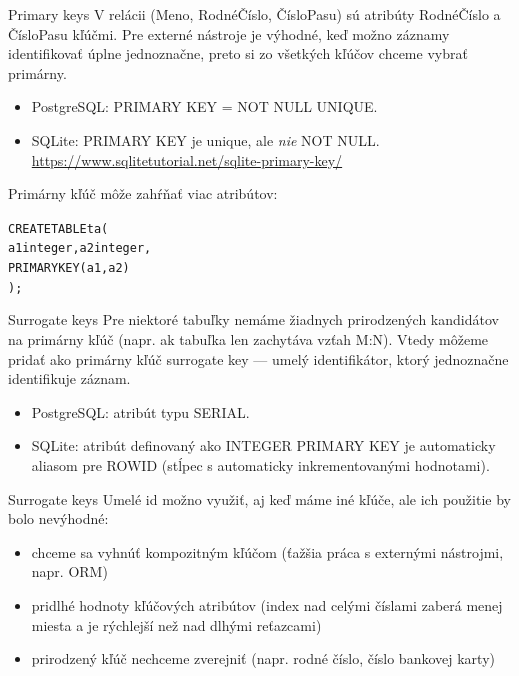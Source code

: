 \documentclass[12pt]{beamer}
\begin{document}
\begin{frame}[fragile]{Primary keys}
V relácii (Meno, RodnéČíslo, ČísloPasu) sú atribúty RodnéČíslo a ČísloPasu kľúčmi.
Pre externé nástroje je výhodné, keď možno záznamy identifikovať úplne jednoznačne,
preto si zo všetkých kľúčov chceme vybrať primárny.
\begin{itemize}
\item PostgreSQL: \alert{PRIMARY KEY} = NOT NULL UNIQUE.
\item SQLite: PRIMARY KEY je unique, ale \emph{nie} NOT NULL.\\
      {\scriptsize \url{https://www.sqlitetutorial.net/sqlite-primary-key/}}
\end{itemize}

\bigskip
Primárny kľúč môže zahŕňať viac atribútov:
\begin{alltt}
CREATE TABLE ta (
  a1 integer, a2 integer,
  \alert{PRIMARY KEY (a1, a2)}
);
\end{alltt}
\end{frame}

\begin{frame}[fragile]{Surrogate keys}
Pre niektoré tabuľky nemáme žiadnych prirodzených kandidátov na primárny kľúč
(napr. ak tabuľka len zachytáva vzťah M:N). Vtedy môžeme pridať ako primárny kľúč
\alert{surrogate key} --- umelý identifikátor, ktorý jednoznačne identifikuje záznam.

\begin{itemize}
\item PostgreSQL: atribút typu SERIAL.
\item SQLite: atribút definovaný ako INTEGER PRIMARY KEY je automaticky aliasom pre ROWID
(stĺpec s automaticky inkrementovanými hodnotami).
\end{itemize}
\end{frame}

\begin{frame}[fragile]{Surrogate keys}
Umelé id možno využiť, aj keď máme iné kľúče, ale ich použitie by bolo nevýhodné:
\begin{itemize}
\item chceme sa vyhnúť kompozitným kľúčom (ťažšia práca s externými nástrojmi, napr. ORM)
\item pridlhé hodnoty kľúčových atribútov (index nad celými číslami zaberá menej miesta
a je rýchlejší než nad dlhými reťazcami)
\item prirodzený kľúč nechceme zverejniť (napr. rodné číslo, číslo bankovej karty)
\end{itemize}
\end{frame}
\end{document}
